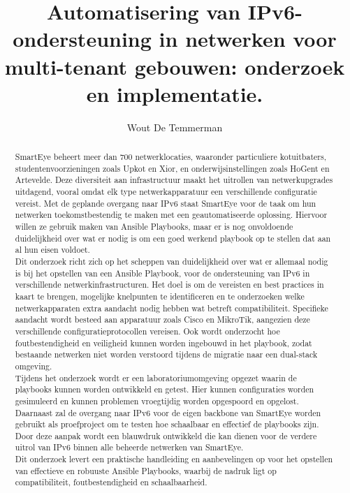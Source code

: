 \documentclass{hogent-article}
\title{Automatisering van IPv6-ondersteuning in netwerken voor multi-tenant gebouwen: onderzoek en implementatie.}
\author{Wout De Temmerman}
\begin{document}
\begin{abstract}
SmartEye beheert meer dan 700 netwerklocaties, waaronder particuliere kotuitbaters, studentenvoorzieningen zoals Upkot en Xior, 
en onderwijsinstellingen zoals HoGent en Artevelde. Deze diversiteit aan infrastructuur maakt het uitrollen van netwerkupgrades uitdagend, 
vooral omdat elk type netwerkapparatuur een verschillende configuratie vereist. 
Met de geplande overgang naar IPv6 staat SmartEye voor de taak om hun netwerken toekomstbestendig te maken met een geautomatiseerde oplossing. 
Hiervoor willen ze gebruik maken van Ansible Playbooks, maar er is nog onvoldoende duidelijkheid over wat er nodig is om een goed werkend playbook op te stellen dat aan al hun eisen voldoet.
\\

Dit onderzoek richt zich op het scheppen van duidelijkheid over wat er allemaal nodig is bij het opstellen van een Ansible Playbook, 
voor de ondersteuning van IPv6 in verschillende netwerkinfrastructuren. Het doel is om de vereisten en best practices in kaart te brengen, 
mogelijke knelpunten te identificeren en te onderzoeken welke netwerkapparaten extra aandacht nodig hebben wat betreft compatibiliteit. 
Specifieke aandacht wordt besteed aan apparatuur zoals Cisco en MikroTik, aangezien deze verschillende configuratieprotocollen vereisen. 
Ook wordt onderzocht hoe foutbestendigheid en veiligheid kunnen worden ingebouwd in het playbook, 
zodat bestaande netwerken niet worden verstoord tijdens de migratie naar een dual-stack omgeving.
\\

Tijdens het onderzoek wordt er een laboratoriumomgeving opgezet waarin de playbooks kunnen worden ontwikkeld en getest. 
Hier kunnen configuraties worden gesimuleerd en kunnen problemen vroegtijdig worden opgespoord en opgelost. 
Daarnaast zal de overgang naar IPv6 voor de eigen backbone van SmartEye worden gebruikt als proefproject om te testen hoe schaalbaar en effectief de playbooks zijn. 
Door deze aanpak wordt een blauwdruk ontwikkeld die kan dienen voor de verdere uitrol van IPv6 binnen alle beheerde netwerken van SmartEye.
\\

Dit onderzoek levert een praktische handleiding en aanbevelingen op voor het opstellen van effectieve en robuuste Ansible Playbooks, 
waarbij de nadruk ligt op compatibiliteit, foutbestendigheid en schaalbaarheid.
\end{abstract}

\tableofcontents



\nocite{*}
\printbibliography[heading=bibintoc]
\end{document}
